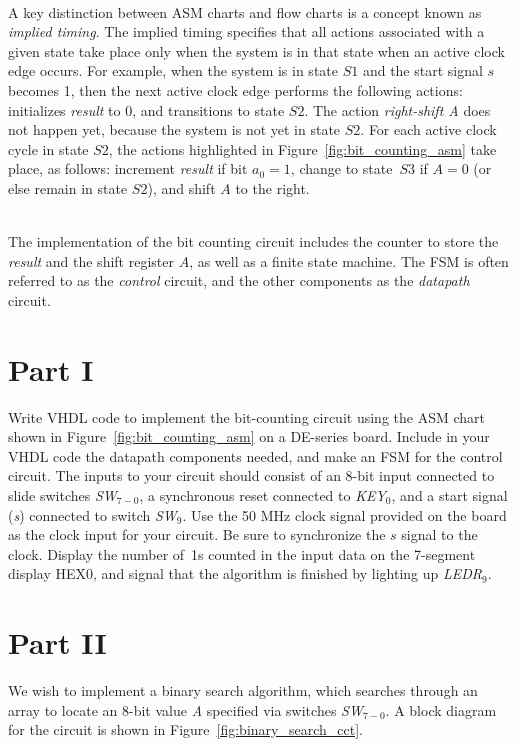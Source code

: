 \documentclass[epsfig,10pt,fullpage]{article}
\begin{document}
~\\
A key distinction between ASM charts and flow charts is a concept known as {\it implied timing}. 
The implied timing specifies that all actions associated with a given state take place
only when the system is in that state when an active clock edge occurs. For example, when
the system is in state $S1$ and the start signal $s$ becomes 1, then the next active clock
edge performs the following actions: initializes {\it result} to 0, and transitions to 
state $S2$. The action {\it right-shift A} does not happen yet, because the system is not yet 
in state $S2$. For each active clock cycle in state $S2$, the actions highlighted in 
Figure~\ref{fig:bit_counting_asm} take place, as follows: increment {\it result} if bit
$a_0 = 1$, change to state~$S3$ if $A = 0$ (or else remain in state $S2$), and shift $A$ to
the right. 

~\\
The implementation of the bit counting circuit includes the counter to store the {\it result} and
the shift register $A$, as well as a finite state machine.  The FSM is often referred to as 
the {\it control} circuit, and the other components as the {\it datapath} circuit. 

\section*{Part I}
Write VHDL code to implement the bit-counting circuit using the ASM chart shown in
Figure~\ref{fig:bit_counting_asm} on a DE-series board. Include in your VHDL code the
datapath components needed, and make an FSM for the control circuit. The inputs to your 
circuit should consist of an 8-bit input connected to slide switches {\it SW}$_{7-0}$, a
synchronous reset connected to {\it KEY}$_0$, and a start signal
({\it s}) connected to switch {\it SW}$_9$. Use the 50 MHz clock signal provided on the
board as the clock input for your circuit. Be sure to synchronize the $s$ signal to the 
clock. Display the number of~1s counted in the input data on the 7-segment display HEX0, and 
signal that the algorithm is finished by lighting up {\it LEDR}$_9$.

\section*{Part II}
We wish to implement a binary search algorithm, which searches through an array to locate 
an 8-bit value {\it A} specified via switches {\it SW}$_{7-0}$. A block diagram for the 
circuit is shown in Figure~\ref{fig:binary_search_cct}.
\end{document}
